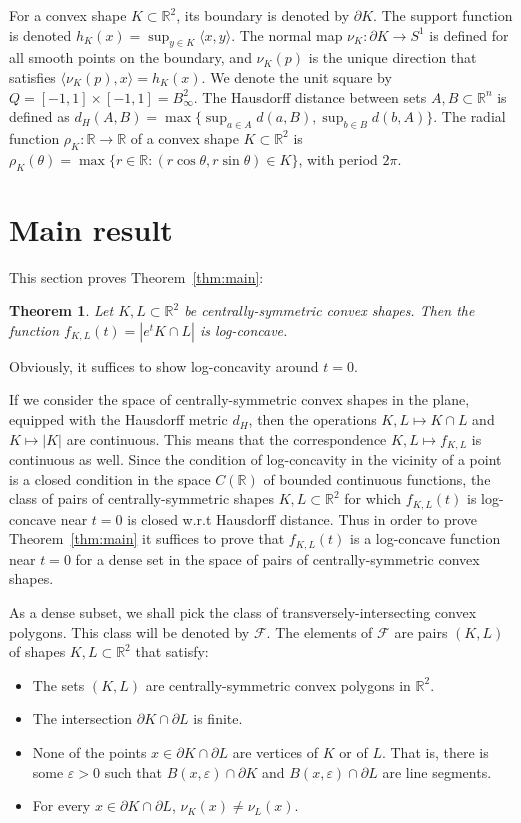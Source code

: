 \documentclass[a4paper,10pt,twoside,reqno,intlimits]{amsart}
\newtheorem*{theorem*}{Theorem}
\begin{document}
For a convex shape $K \subset {\mathbb{R}}^2$, its boundary is denoted by ${\partial K}$.
The support function is denoted $h_K(x) = \sup_{y \in K} \langle x, y \rangle$.
The normal map $\nu_K : {\partial K} \to S^1$ is defined for all smooth points on the boundary,
and $\nu_K(p)$ is the unique direction that satisfies
$\langle\nu_K(p),x\rangle = h_K(x)$.
We denote the unit square by $Q = [-1,1] \times [-1,1] = B^2_{\infty}$.
The Hausdorff distance between sets $A, B \subset {\mathbb{R}}^n$ is defined as
$d_H(A,B) = \max \{ \sup_{a \in A} d(a, B), \sup_{b \in B} d(b, A) \}$.
The radial function $\rho_K : {\mathbb{R}} \to {\mathbb{R}}$ of a convex shape $K \subset {\mathbb{R}}^2$ is
$\rho_K(\theta) = \max \{ r \in {\mathbb{R}} : (r \cos \theta, r \sin \theta) \in K \}$, with period $2 \pi$.

\section{Main result}
\label{sec:main}

This section proves Theorem~\ref{thm:main}:
\begin{theorem*}
Let $K,L \subset {\mathbb{R}}^2$ be centrally-symmetric convex shapes.
Then the function $f_{K,L}(t) = |e^t K \cap L|$ is log-concave.
\end{theorem*}

Obviously, it suffices to show log-concavity around $t=0$.

If we consider the space of centrally-symmetric convex shapes in the plane, equipped with the Hausdorff metric $d_H$,
then the operations $K, L \mapsto K \cap L$ and $K \mapsto |K|$ are continuous.
This means that the correspondence $K, L \mapsto f_{K,L}$ is continuous as well.
Since the condition of log-concavity in the vicinity of a point is a closed condition in the space
$C({\mathbb{R}})$ of bounded continuous functions,
the class of pairs of centrally-symmetric shapes $K, L \subset {\mathbb{R}}^2$ for which $f_{K,L}(t)$ is log-concave
near $t = 0$ is closed w.r.t Hausdorff distance.
Thus in order to prove Theorem~\ref{thm:main} it suffices to prove that $f_{K,L}(t)$ is a log-concave function
near $t = 0$ for a dense set in the space of pairs of centrally-symmetric convex shapes.

As a dense subset, we shall pick the class of transversely-intersecting convex polygons.
This class will be denoted by ${\mathcal{F}}$.
The elements of ${\mathcal{F}}$ are pairs $(K,L)$ of shapes $K,L \subset {\mathbb{R}}^2$ that satisfy:
\begin{itemize}
\item The sets $(K,L)$ are centrally-symmetric convex polygons in ${\mathbb{R}}^2$.
\item The intersection ${\partial K} \cap {\partial L}$ is finite.
\item None of the points $x \in {\partial K} \cap {\partial L}$ are vertices of $K$ or of $L$.
That is, there is some $\varepsilon > 0$ such that $B(x,\varepsilon) \cap {\partial K}$ and
$B(x,\varepsilon) \cap {\partial L}$ are line segments.
\item For every $x \in {\partial K} \cap {\partial L}$, $\nu_K(x) \neq \nu_L(x)$.
\end{itemize}
\end{document}

